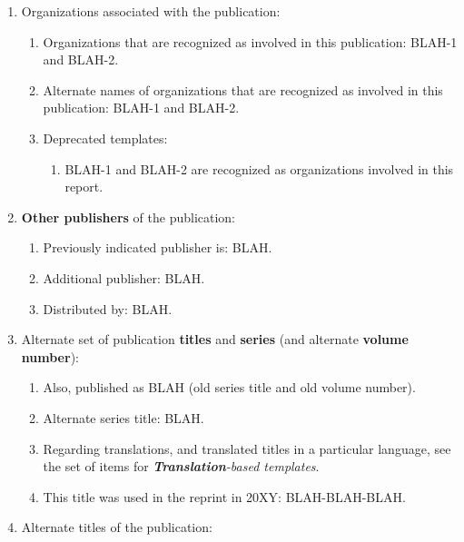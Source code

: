 \documentclass[letter,12pt]{article}
\begin{document}
\begin{enumerate}
\begin{enumerate}
\begin{enumerate}
		\item Unknown publisher; see the following for an alternate BibTeX entry without an associated publisher: BibTeX-KEY.
		\end{enumerate}
	\item Organizations associated with the publication: \vspace{-0.2cm}
		\begin{enumerate} \itemsep -2pt
		\item Organizations that are recognized as involved in this publication: BLAH-1 and BLAH-2.
		\item Alternate names of organizations that are recognized as involved in this publication: BLAH-1 and BLAH-2.
		\item Deprecated templates: \vspace{-0.1cm}
			\begin{enumerate} \itemsep -1pt
			\item BLAH-1 and BLAH-2 are recognized as organizations involved in this report.
			\end{enumerate}
		\end{enumerate}
	\item {\bf Other publishers} of the publication: \vspace{-0.2cm}
		\begin{enumerate} \itemsep -2pt
		\item Previously indicated publisher is: BLAH.
		\item Additional publisher: BLAH.
		\item Distributed by: BLAH.
		\end{enumerate}
	\item Alternate set of publication {\bf titles} and {\bf series} (and alternate {\bf volume number}): \vspace{-0.2cm}
		\begin{enumerate} \itemsep -2pt
		\item Also, published as BLAH (old series title and old volume number).
		\item Alternate series title: BLAH.
		\item Regarding translations, and translated titles in a particular language, see the set of items for {\it {\bf Translation}-based templates}.
		\item This title was used in the reprint in 20XY: BLAH-BLAH-BLAH.
		\end{enumerate}
	\item Alternate titles of the publication: \vspace{-0.2cm}

\end{enumerate}
\end{enumerate}
\end{document}
